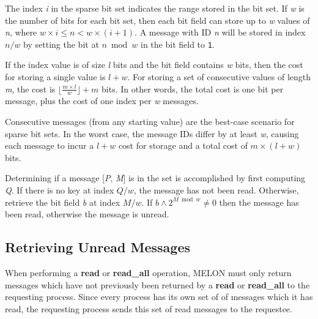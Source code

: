 \documentclass{llncs}
\begin{document}
The index \textit{i} in the sparse bit set indicates the range stored in the bit set. If \textit{w} is the number of bits for each bit set, then each bit field can store up to \textit{w} values of \textit{n}, where $w \times i \leq n < w \times (i + 1)$. A message with ID \textit{n} will be stored in index $n/w$ by setting the bit at $n \bmod w$ in the bit field to \texttt{1}.

If the index value is of size \textit{l} bits and the bit field contains \textit{w} bits, then the cost for storing a single value is $l + w$. For storing a set of consecutive values of length \textit{m}, the cost is $\lfloor \frac{m \times l}{w} \rfloor + m$ bits. In other words, the total cost is one bit per message, plus the cost of one index per \textit{w} messages.

%

Consecutive messages (from any starting value) are the best-case scenario for sparse bit sets. In the worst case, the message IDs differ by at least \textit{w}, causing each message to incur a $l + w$ cost for storage and a total cost of $m \times (l + w)$ bits.

Determining if a message [\textit{P}, \textit{M}] is in the set is accomplished by first computing \textit{Q}. If there is no key at index $Q/w$, the message has not been read. Otherwise, retrieve the bit field \textit{b} at index $M / w$. If $b \wedge 2^{M \bmod w} \neq 0$ then the message has been read, otherwise the message is unread.
    
\subsection{Retrieving Unread Messages}

When performing a \textbf{read} or \textbf{read\_all} operation, MELON must only return messages which have not previously been returned by a \textbf{read} or \textbf{read\_all} to the requesting process. Since every process has its own set of of messages which it has read, the requesting process sends this set of read messages to the requestee.
\end{document}
